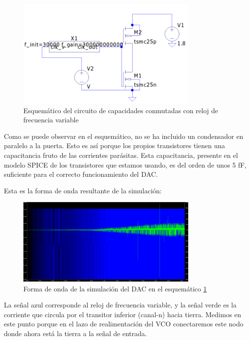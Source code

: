 \documentclass[12pt]{report} %
\begin{document}
	\begin{figure}[H]
		\includegraphics[width=0.8\textwidth]{ltspice-sw-with-clk-freq.png}
		\caption[Esquemático del circuito de capacidades conmutadas con reloj de frecuencia variable]{Esquemático del circuito de capacidades conmutadas con reloj de frecuencia variable}
		\label{fig:ltspice-sw-with-clk-freq.png}
	\end{figure}

	Como se puede observar en el esquemático, no se ha incluido un condensador en paralelo a la puerta. Esto es así porque los propios transistores tienen una capacitancia fruto de las corrientes parásitas. Esta capacitancia, presente en el modelo SPICE de los transistores que estamos usando, es del orden de unos 5 fF, suficiente para el correcto funcionamiento del DAC.

	Esta es la forma de onda resultante de la simulación:
	
	\begin{figure}[H]
		\includegraphics[width=0.8\textwidth]{dac-sim-waveform.png}
		\caption[Forma de onda de la simulación del DAC en el esquemático \ref{fig:ltspice-sw-with-clk-freq.png}]{Forma de onda de la simulación del DAC en el esquemático \ref{fig:ltspice-sw-with-clk-freq.png}}
		\label{fig:dac-graph-waveform.png}
	\end{figure}

	La señal azul corresponde al reloj de frecuencia variable, y la señal verde es la corriente que circula por el transitor inferior (canal-n) hacia tierra. Medimos en este punto porque en el lazo de realimentación del VCO conectaremos este nodo donde ahora está la tierra a la señal de entrada.
	
\end{document}
